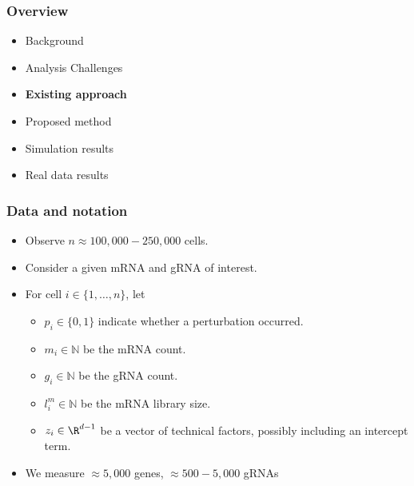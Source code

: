\documentclass{beamer}
\begin{document}




\begin{frame}
\frametitle{Overview}
\begin{itemize}
\item Background
\item Analysis Challenges
\item \textbf{Existing approach}
\item Proposed method
\item Simulation results
\item Real data results
\end{itemize}
\end{frame}


\begin{frame}
\frametitle{Data and notation}

\begin{itemize}
\item Observe $n \approx 100,000 - 250,000$ cells.
\item Consider a given mRNA and gRNA of interest.
\item For cell $i \in \{1, \dots, n\}$, let 
\begin{itemize}
\item $p_i \in \{0, 1\}$ indicate whether a perturbation occurred. 
\item $m_i \in \mathbb{N}$ be the mRNA count.
\item $g_i \in \mathbb{N}$ be the gRNA count.
\item $l^m_i \in \mathbb{N}$ be the mRNA library size.
\item $z_i \in \R^{d-1}$ be a vector of technical factors, possibly including an intercept term.
\end{itemize}
\item We measure $\approx5,000$ genes, $\approx500 - 5,000$ gRNAs
\end{itemize}
\end{frame}
\end{document}

